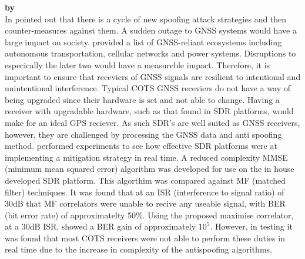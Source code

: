 \medskip

\textbf{\emph{} by \citeauthor{RN18}} \\
In  \citeauthor{RN18} \cite{RN18} pointed out that there is a cycle of new spoofing attack strategies and then counter-measures
against them. A sudden outage to GNSS systems would have a large impact on society. \citeauthor{RN18} provided a list of GNSS-reliant ecosystems including
autonomous transportation, cellular networks and power systems. Disruptions to especically the later two would have a measureble impact. Therefore, it is
important to ensure that receviers of GNSS signals are resilient to intentional and unintentional interference.
Typical COTS GNSS receviers do not have a way of being upgraded since their hardware is set and not able to change. Having a receiver
with upgradable hardware, such as that found in SDR platforms, would make for an ideal GPS reciever. As such SDR's are well suited as GNSS receivers,
however, they are challenged by processing the GNSS data and anti spoofing method. \citeauthor{RN18} performed experiments to see how effective SDR 
platforms were at implementing a mitigation strategy in real time. A reduced complexity MMSE (minimum mean squared error) algorithm was developed for
use on the in house developed SDR platform. This algorthim was compared against MF (matched filter) techniques. It was found that at an ISR (interference to signal ratio)
of 30dB that MF correlators were unable to recive any useable signal, with BER (bit error rate) of approximatelty 50\%. Using the proposed maximise
correlator, at a 30dB ISR, showed a BER gain of approximately $10^5$. 
However, in testing it was found that most COTS receivers were not able to perform these duties in real time due to the increase in complexity of the antispoofing algorithms.

\medskip


